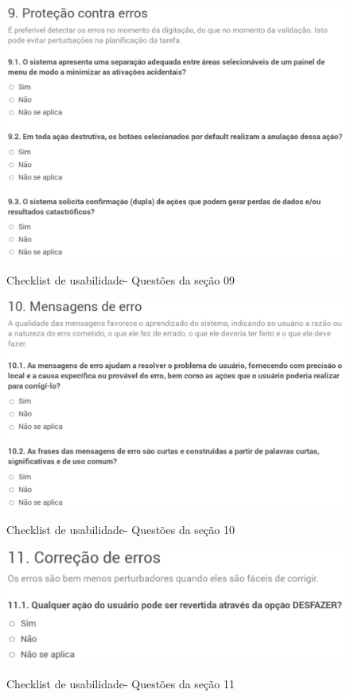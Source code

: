 	\begin{figure}[!h]
    	\centering
    	\includegraphics[keepaspectratio=true,scale=0.45]
      		{figuras/check09.eps}
    	\label{check04}
		\caption{Checklist de usabilidade- Questões da seção 09}
	\end{figure}

	\begin{figure}[!h]
    	\centering
    	\includegraphics[keepaspectratio=true,scale=0.45]
      		{figuras/check10.eps}
    	\label{check04}
		\caption{Checklist de usabilidade- Questões da seção 10}
	\end{figure}

	\begin{figure}[!h]
    	\centering
    	\includegraphics[keepaspectratio=true,scale=0.45]
      		{figuras/check11.eps}
    	\label{check04}
		\caption{Checklist de usabilidade- Questões da seção 11}
	\end{figure}


